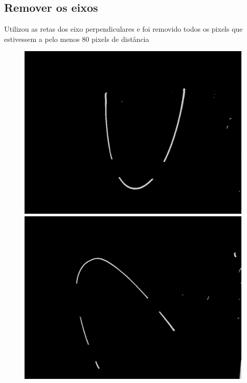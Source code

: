 \documentclass{article}
\begin{document}
   \subsection{Remover os eixos}
   Utilizou as retas dos eixo perpendiculares e foi removido todos os pixels que estivessem a pelo menos 80 pixels de distância
   \begin{figure}[h!]
   \centering
    \subfigure
        {\includegraphics[scale=0.1]{exemplo1WithoutAxis.jpg}}
    \subfigure
        {\includegraphics[scale=0.1]{exemplo2WithoutAxis.jpg}}
    \subfigure

\end{figure}
\end{document}
